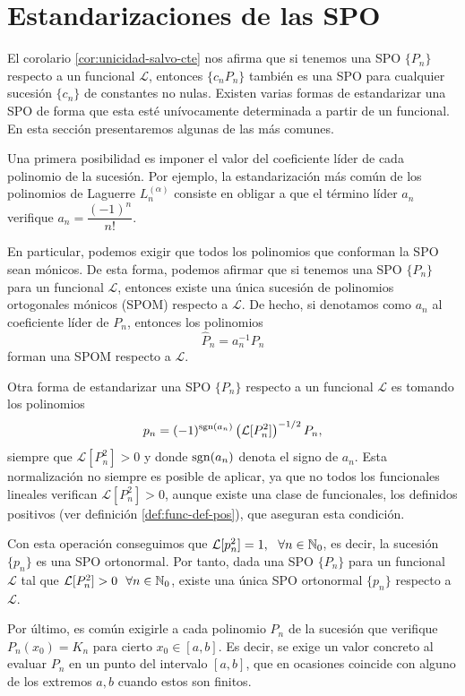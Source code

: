 \section{Estandarizaciones de las SPO}

El corolario \ref{cor:unicidad-salvo-cte} nos afirma que si tenemos una SPO $\{P_n\}$ respecto a un funcional $\mathcal L$, entonces $\{c_n P_n\}$ también es una SPO para cualquier sucesión $\{c_n\}$ de constantes no nulas. Existen varias formas de estandarizar una SPO de forma que esta esté unívocamente determinada a partir de un funcional. En esta sección presentaremos algunas de las más comunes.

Una primera posibilidad es imponer el valor del coeficiente líder de cada polinomio de la sucesión. Por ejemplo, la estandarización más común de los polinomios de Laguerre $L_n^{(\alpha)}$ consiste en obligar a que el término líder $a_n$ verifique $a_n =\dfrac{(-1)^n}{n!}$.

En particular, podemos exigir que todos los polinomios que conforman la SPO sean mónicos. De esta forma, podemos afirmar que si tenemos una SPO $\{P_n\}$ para un funcional $\mathcal L$, entonces existe una única sucesión de polinomios ortogonales mónicos (SPOM) respecto a $\mathcal L$. De hecho, si denotamos como $a_n$ al coeficiente líder de $P_n$, entonces los polinomios
$$
\hat P_n=a_n^{-1} P_n
$$
forman una SPOM respecto a $\mathcal{L}$.

Otra forma de estandarizar una SPO $\{P_n\}$ respecto a un funcional $\mathcal L$ es tomando los polinomios 
$$
p_n = (-1)^{\mathrm{sgn}(a_n)}\left(\mathcal L[P_n^2]\right)^{-1/2} P_n,
$$
siempre que $\mathcal L[P_n^2]>0$ y donde $\mathrm{sgn}(a_n)$ denota el signo de $a_n$. Esta normalización no siempre es posible de aplicar, ya que no todos los funcionales lineales verifican $\mathcal L[P_n^2]>0$, aunque existe una clase de funcionales, los definidos positivos (ver definición \ref{def:func-def-pos}), que aseguran esta condición.

Con esta operación conseguimos que $\mathcal L[p_n^2] = 1, \ \ \forall n\in\mathbb{N}_0$, es decir, la sucesión $\{p_n\}$ es una SPO ortonormal. Por tanto, dada una SPO $\{P_n\}$ para un funcional $\mathcal L$ tal que $\mathcal{L}[P_n^2]>0\ \ \forall n\in\mathbb{N}_0$, existe una única SPO ortonormal $\{p_n\}$ respecto a $\mathcal{L}$.

Por último, es común exigirle a cada polinomio $P_n$ de la sucesión que verifique $P_n(x_0)=K_n$ para cierto $x_0\in[a,b]$. Es decir, se exige un valor concreto al evaluar $P_n$ en un punto del intervalo $[a,b]$, que en ocasiones coincide con alguno de los extremos $a,b$ cuando estos son finitos.

